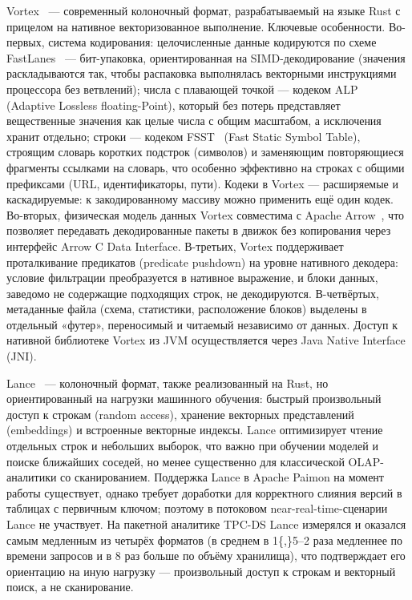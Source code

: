 Vortex~\cite{vortex-repo, vortex-docs} --- современный колоночный формат, разрабатываемый на языке Rust с
прицелом на нативное векторизованное выполнение. Ключевые особенности. Во-первых,
система кодирования: целочисленные данные кодируются по схеме FastLanes~\cite{afroozeh2023fastlanes} ---
бит-упаковка, ориентированная на SIMD-декодирование (значения раскладываются так,
чтобы распаковка выполнялась векторными инструкциями процессора без ветвлений);
числа с плавающей точкой --- кодеком ALP~\cite{afroozeh2024alp} (Adaptive Lossless floating-Point), который
без потерь представляет вещественные значения как целые числа с общим масштабом, а
исключения хранит отдельно; строки --- кодеком FSST~\cite{boncz2020fsst} (Fast Static Symbol Table),
строящим словарь коротких подстрок (символов) и заменяющим повторяющиеся фрагменты
ссылками на словарь, что особенно эффективно на строках с общими префиксами (URL,
идентификаторы, пути). Кодеки в Vortex --- расширяемые и каскадируемые: к закодированному
массиву можно применить ещё один кодек. Во-вторых, физическая модель данных Vortex
совместима с Apache Arrow~\cite{arrow-site}, что позволяет передавать декодированные пакеты в движок
без копирования через интерфейс Arrow C Data Interface. В-третьих, Vortex
поддерживает проталкивание предикатов (predicate pushdown) на уровне нативного
декодера: условие фильтрации преобразуется в нативное выражение, и блоки данных,
заведомо не содержащие подходящих строк, не декодируются. В-четвёртых, метаданные
файла (схема, статистики, расположение блоков) выделены в отдельный «футер»,
переносимый и читаемый независимо от данных. Доступ к нативной библиотеке Vortex из
JVM осуществляется через Java Native Interface (JNI).

Lance~\cite{lance-docs} --- колоночный формат, также реализованный на Rust, но
ориентированный на нагрузки машинного обучения: быстрый произвольный доступ к
строкам (random access), хранение векторных представлений (embeddings) и встроенные
векторные индексы. Lance оптимизирует чтение отдельных строк и небольших выборок,
что важно при обучении моделей и поиске ближайших соседей, но менее существенно для
классической OLAP-аналитики со сканированием. Поддержка Lance в Apache Paimon на
момент работы существует, однако требует доработки для корректного слияния версий в
таблицах с первичным ключом; поэтому в потоковом near-real-time-сценарии Lance не
участвует. На пакетной аналитике TPC-DS Lance измерялся и оказался самым медленным
из четырёх форматов (в среднем в \num{1{,}5}--\num{2} раза медленнее по времени
запросов и в \num{8} раз больше по объёму хранилища), что подтверждает его
ориентацию на иную нагрузку --- произвольный доступ к строкам и векторный поиск,
а не сканирование.

